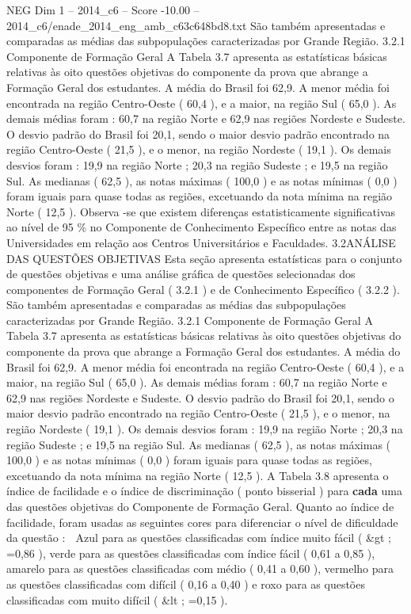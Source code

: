 \begin{textsample}{NEG Dim 1 – 2014\_c6 – Score -10.00 – 2014\_c6/enade\_2014\_eng\_amb\_c63c648bd8.txt}
São também apresentadas e comparadas as médias das subpopulações caracterizadas por Grande Região. 3.2.1 Componente de Formação Geral A Tabela 3.7 apresenta as estatísticas básicas relativas às oito questões objetivas do componente da prova que abrange a Formação Geral dos estudantes.
A média do Brasil foi 62,9.
A menor média foi encontrada na região Centro-Oeste ( 60,4 ), e a maior, na região Sul ( 65,0 ).
As demais médias foram : 60,7 na região Norte e 62,9 nas regiões Nordeste e Sudeste.
O desvio padrão do Brasil foi 20,1, sendo o maior desvio padrão encontrado na região Centro-Oeste ( 21,5 ), e o menor, na região Nordeste ( 19,1 ).
Os demais desvios foram : 19,9 na região Norte ; 20,3 na região Sudeste ; e 19,5 na região Sul.
As medianas ( 62,5 ), as notas máximas ( 100,0 ) e as notas mínimas ( 0,0 ) foram iguais para quase todas as regiões, excetuando da nota mínima na região Norte ( 12,5 ).
Observa -se que existem diferenças estatisticamente significativas ao nível de 95 \% no Componente de Conhecimento Específico entre as notas das Universidades em relação aos Centros Universitários e Faculdades. 3.2ANÁLISE DAS QUESTÕES OBJETIVAS Esta seção apresenta estatísticas para o conjunto de questões objetivas e uma análise gráfica de questões selecionadas dos componentes de Formação Geral ( 3.2.1 ) e de Conhecimento Específico ( 3.2.2 ).
São também apresentadas e comparadas as médias das subpopulações caracterizadas por Grande Região. 3.2.1 Componente de Formação Geral A Tabela 3.7 apresenta as estatísticas básicas relativas às oito questões objetivas do componente da prova que abrange a Formação Geral dos estudantes.
A média do Brasil foi 62,9.
A menor média foi encontrada na região Centro-Oeste ( 60,4 ), e a maior, na região Sul ( 65,0 ).
As demais médias foram : 60,7 na região Norte e 62,9 nas regiões Nordeste e Sudeste.
O desvio padrão do Brasil foi 20,1, sendo o maior desvio padrão encontrado na região Centro-Oeste ( 21,5 ), e o menor, na região Nordeste ( 19,1 ).
Os demais desvios foram : 19,9 na região Norte ; 20,3 na região Sudeste ; e 19,5 na região Sul.
As medianas ( 62,5 ), as notas máximas ( 100,0 ) e as notas mínimas ( 0,0 ) foram iguais para quase todas as regiões, excetuando da nota mínima na região Norte ( 12,5 ).
A Tabela 3.8 apresenta o índice de facilidade e o índice de discriminação ( ponto bisserial ) para \textbf{cada} uma das questões objetivas do Componente de Formação Geral.
Quanto ao índice de facilidade, foram usadas as seguintes cores para diferenciar o nível de dificuldade da questão :  Azul para as questões classificadas com índice muito fácil ( \&gt ; =0,86 ), verde para as questões classificadas com índice fácil ( 0,61 a 0,85 ), amarelo para as questões classificadas com médio ( 0,41 a 0,60 ), vermelho para as questões classificadas com difícil ( 0,16 a 0,40 ) e roxo para as questões classificadas com muito difícil ( \&lt ; =0,15 ).

\end{textsample}
